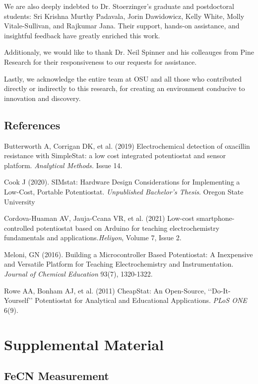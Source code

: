 \documentclass{article}
\begin{document}
We are also deeply indebted to Dr. Stoerzinger's graduate and postdoctoral students: Sri Krishna Murthy Padavala, Jorin Dawidowicz, Kelly White, Molly Vitale-Sullivan, and Rajkumar Jana. Their support, hands-on assistance, and insightful feedback have greatly enriched this work.

Additionaly, we would like to thank Dr. Neil Spinner and his colleauges from Pine Research for their responsiveness to our requests for assistance. 

Lastly, we acknowledge the entire team at OSU and all those who contributed directly or indirectly to this research, for creating an environment conducive to innovation and discovery.


\subsection*{References}
Butterworth A, Corrigan DK, et al. (2019) Electrochemical detection of oxacillin resistance with SimpleStat: a low cost integrated potentiostat and sensor platform. \emph{Analytical Methods.} Issue 14.


Cook J (2020). SIMstat: Hardware Design Considerations for Implementing a Low-Cost, Portable Potentiostat. \emph{Unpublished Bachelor's Thesis}. Oregon State University


Cordova-Huaman AV, Jauja-Ccana VR, et al. (2021) Low-cost smartphone-controlled potentiostat based on Arduino for teaching electrochemistry fundamentals and applications.\emph{Heliyon}, Volume 7, Issue 2.


Meloni, GN (2016). Building a Microcontroller Based Potentiostat: A Inexpensive and Versatile Platform for Teaching Electrochemistry and Instrumentation. \emph{Journal of Chemical Education} 93(7), 1320-1322.


Rowe AA, Bonham AJ, et al. (2011) CheapStat: An Open-Source, ‘‘Do-It-Yourself’’ Potentiostat for Analytical and Educational Applications. \emph{PLoS ONE} 6(9).


\newpage
\section*{Supplemental Material}
\subsection*{FeCN Measurement}
\end{document}

